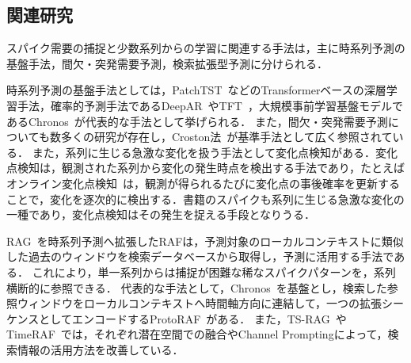 \documentclass[twocolumn, lastpage]{jarticle}
\newif\ifrevmark
\newcommand{\revA}[1]{\ifrevmark{\color{blue}#1}\else#1\fi}
\begin{document}
\subsection{関連研究}

スパイク需要の捕捉と少数系列からの学習に関連する手法は，主に時系列予測の基盤手法，間欠・突発需要予測，検索拡張型予測に分けられる．

時系列予測の基盤手法としては，PatchTST~\cite{Nie.2023}などのTransformerベースの深層学習手法，確率的予測手法であるDeepAR~\cite{Salinas.2020}やTFT~\cite{Lim.2021}，大規模事前学習基盤モデルであるChronos~\cite{Ansari.2024}が代表的な手法として挙げられる．
また，間欠・突発需要予測についても数多くの研究が存在し，Croston法~\cite{Croston.1972}が基準手法として広く参照されている．
\revA{また，系列に生じる急激な変化を扱う手法として変化点検知がある．変化点検知は，観測された系列から変化の発生時点を検出する手法であり，たとえばオンライン変化点検知~\cite{Adams.2007}は，観測が得られるたびに変化点の事後確率を更新することで，変化を逐次的に検出する．書籍のスパイクも系列に生じる急激な変化の一種であり，変化点検知はその発生を捉える手段となりうる．}

RAG~\cite{Lewis.2020}を時系列予測へ拡張したRAFは，予測対象のローカルコンテキストに類似した過去のウィンドウを検索データベースから取得し，予測に活用する手法である．
これにより，単一系列からは捕捉が困難な稀なスパイクパターンを，系列横断的に参照できる．
代表的な手法として，Chronos~\cite{Ansari.2024}を基盤とし，検索した参照ウィンドウをローカルコンテキストへ時間軸方向に連結して，一つの拡張シーケンスとしてエンコードするProtoRAF~\cite{Tire.2024}がある．
また，TS-RAG~\cite{Ning.2025}やTimeRAF~\cite{Zhang.2024}では，それぞれ潜在空間での融合やChannel Promptingによって，検索情報の活用方法を改善している．
\end{document}
